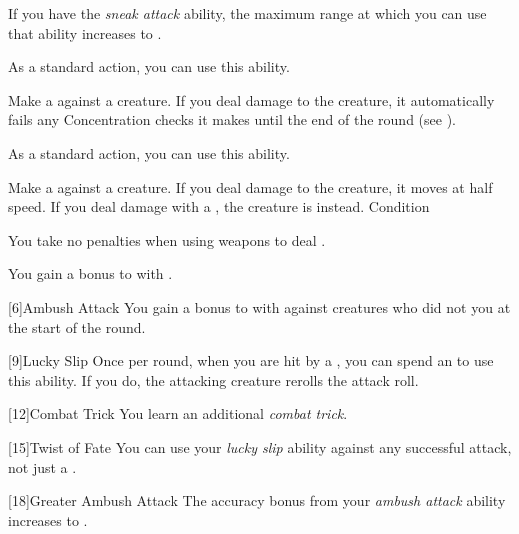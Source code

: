              If you have the \textit{sneak attack} ability, the maximum range at which you can use that ability increases to \rnglong.

             As a standard action, you can use this ability.
            \begin{ability}
                \begin{spelleffects}
                    \spelleffect Make a  against a creature.
                    If you deal damage to the creature, it automatically fails any Concentration checks it makes until the end of the round (see ).
                \end{spelleffects}
            \end{ability}

             As a standard action, you can use this ability.
            \begin{ability}
                \begin{spelleffects}
                    \spelleffect Make a  against a creature.
                    If you deal damage to the creature, it moves at half speed.
                    If you deal damage with a , the creature is \immobilized instead.
                    \spelldur Condition
                \end{spelleffects}
            \end{ability}

             You take no penalties when using weapons to deal .


             You gain a  bonus to  with .

            [6]{Ambush Attack}
            You gain a  bonus to  with  against creatures who did not  you at the start of the round.

            [9]{Lucky Slip} Once per round, when you are hit by a , you can spend an  to use this ability.
            If you do, the attacking creature rerolls the attack roll.

            [12]{Combat Trick}
            You learn an additional \textit{combat trick}.

            [15]{Twist of Fate} You can use your \textit{lucky slip} ability against any successful attack, not just a .

            [18]{Greater Ambush Attack}
            The accuracy bonus from your \textit{ambush attack} ability increases to .
